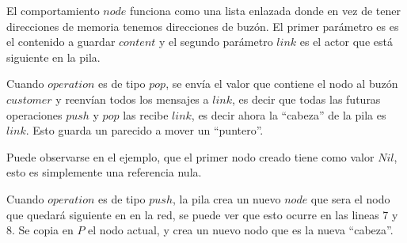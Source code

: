 El comportamiento $node$ funciona como una lista enlazada donde en vez de tener direcciones de memoria tenemos direcciones de buzón. El primer parámetro es es el contenido a guardar $content$ y el segundo parámetro $link$ es el actor que está siguiente en la pila.

Cuando $operation$ es de tipo $pop$, se envía el valor que contiene el nodo al buzón $customer$ y reenvían todos los mensajes a $link$, es decir que todas las futuras operaciones $push$ y $pop$ las recibe $link$, es decir ahora la ``cabeza'' de la pila es $link$. Esto guarda un parecido a mover un ``puntero''.

Puede observarse en el ejemplo, que el primer nodo creado tiene como valor $Nil$, esto es simplemente una referencia nula. 

Cuando $operation$ es de tipo $push$, la pila crea un nuevo $node$ que sera el nodo que quedará siguiente en en la red, se puede ver que esto ocurre en las lineas 7 y 8. Se copia en $P$ el nodo actual, y crea un nuevo nodo que es la nueva ``cabeza''.


